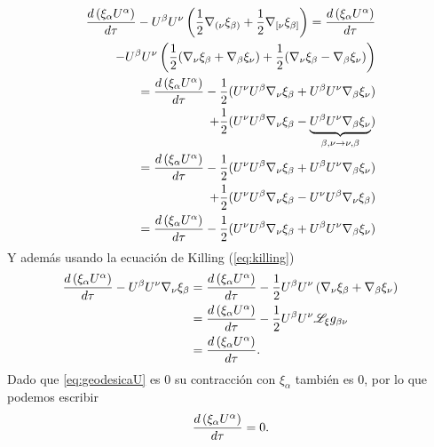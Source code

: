 \begin{equation}
    \begin{aligned}
        \frac{d \left(\xi_\alpha U^\alpha\right)}{d  \tau} - U^\beta U^\nu \left(\frac{1}{2}\mathbf{\nabla}_{(\nu }\xi_{\beta)} + \frac{1}{2}\mathbf{\nabla}_{[\nu }\xi_{\beta]}\right)  = \frac{d \left(\xi_\alpha U^\alpha\right)}{d  \tau}
        \\ -U^\beta U^\nu \left(\frac{1}{2}(\mathbf{\nabla}_{\nu }\xi_{\beta} + \mathbf{\nabla}_{\beta }\xi_{\nu}) + \frac{1}{2}(\mathbf{\nabla}_{\nu }\xi_{\beta} - \mathbf{\nabla}_{\beta }\xi_{\nu})\right) \\
        =\frac{d \left(\xi_\alpha U^\alpha\right)}{d  \tau} - \frac{1}{2}(U^\nu U^\beta  \mathbf{\nabla}_{\nu }\xi_{\beta} + U^\beta U^\nu\mathbf{\nabla}_{\beta }\xi_{\nu})   \\
        + \frac{1}{2}( U^\nu U^\beta \mathbf{\nabla}_{\nu }\xi_{\beta} - \underbrace{U^\beta U^\nu\mathbf{\nabla}_{\beta }\xi_{\nu}}_{\beta,\nu \rightarrow \nu,\beta}) \\
        =\frac{d \left(\xi_\alpha U^\alpha\right)}{d  \tau} - \frac{1}{2}(U^\nu U^\beta  \mathbf{\nabla}_{\nu }\xi_{\beta} + U^\beta U^\nu\mathbf{\nabla}_{\beta }\xi_{\nu})   \\
        + \frac{1}{2}( U^\nu U^\beta \mathbf{\nabla}_{\nu }\xi_{\beta} -  U^\nu U^\beta \mathbf{\nabla}_{\nu }\xi_{\beta})                                              \\
        =\frac{d \left(\xi_\alpha U^\alpha\right)}{d  \tau} - \frac{1}{2}(U^\nu U^\beta  \mathbf{\nabla}_{\nu }\xi_{\beta} + U^\beta U^\nu\mathbf{\nabla}_{\beta }\xi_{\nu})
    \end{aligned}
\end{equation}
Y además usando la ecuación de Killing (\ref{eq:killing})
\begin{equation}
    \begin{aligned}
        \frac{d \left(\xi_\alpha U^\alpha\right)}{d  \tau} - U^\beta U^\nu \mathbf{\nabla}_\nu \xi_\beta & = \frac{d \left(\xi_\alpha U^\alpha\right)}{d  \tau} - \frac{1}{2}U^\beta U^\nu  \left( \mathbf{\nabla}_\nu \xi_\beta + \mathbf{\nabla}_\beta \xi_\nu \right) \\
                                                                                             & = \frac{d \left(\xi_\alpha U^\alpha\right)}{d  \tau} - \frac{1}{2}U^\beta U^\nu \mathscr{L}_\xi g_{\beta \nu}                                       \\
                                                                                             & = \frac{d \left(\xi_\alpha U^\alpha\right)}{d  \tau}.
    \end{aligned}
\end{equation}
Dado que \ref{eq:geodesicaU} es $0$ su contracción con $\xi_\alpha$ también es $0$, por lo que podemos escribir
\begin{equation}
    \frac{d \left(\xi_\alpha U^\alpha\right)}{d  \tau} = 0.
    \label{eq:KillingCantidadConservada}
\end{equation}

